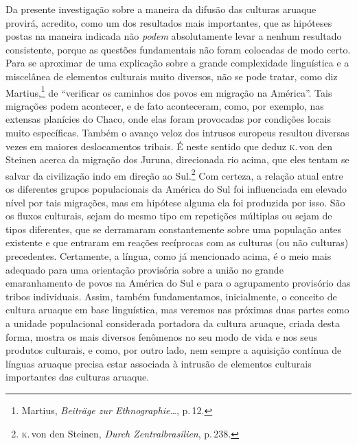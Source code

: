 Da presente investigação sobre a maneira da difusão das culturas
aruaque provirá, acredito, como um dos resultados mais importantes, que
as hipóteses postas na maneira indicada não \textit{podem} absolutamente
levar a nenhum resultado consistente, porque as questões fundamentais
não foram colocadas de modo certo. Para se aproximar de uma explicação
sobre a grande complexidade linguística e a miscelânea de elementos
culturais muito diversos, não se pode tratar, como diz Martius,\footnote{Martius,
  \textit{Beiträge zur Ethnographie\ldots}, p.\,12.} de ``verificar os caminhos dos povos em migração na América''.
Tais migrações podem acontecer, e de fato aconteceram, como, por
exemplo, nas extensas planícies do Chaco, onde elas foram provocadas por
condições locais muito específicas. Também o avanço veloz dos intrusos
europeus resultou diversas vezes em maiores deslocamentos tribais.
É neste sentido que deduz \textsc{k}.\,von den Steinen acerca da migração dos Juruna, direcionada rio
acima, que eles tentam se salvar da civilização indo em direção ao
Sul.\footnote{\textsc{k}.\,von den Steinen, \textit{Durch Zentralbrasilien}, p.\,238.}
Com certeza, a relação atual entre os diferentes grupos populacionais da
América do Sul foi influenciada em elevado nível por tais migrações, mas
em hipótese alguma ela foi produzida por isso. São os fluxos culturais,
sejam do mesmo tipo em repetições múltiplas ou sejam de tipos
diferentes, que se derramaram constantemente sobre uma população antes
existente e que entraram em reações recíprocas com as culturas (ou
não culturas) precedentes. Certamente, a língua, como já mencionado
acima, é o meio mais adequado para uma orientação provisória sobre a
união no grande emaranhamento de povos na América do Sul e para o
agrupamento provisório das tribos individuais. Assim, também
fundamentamos, inicialmente, o conceito de cultura aruaque em base
linguística, mas veremos nas próximas duas partes como a unidade
populacional considerada portadora da cultura aruaque, criada desta
forma, mostra os mais diversos fenômenos no seu modo de vida e nos seus
produtos culturais, e como, por outro lado, nem sempre a aquisição
contínua de línguas aruaque precisa estar associada à intrusão de
elementos culturais importantes das culturas aruaque.

